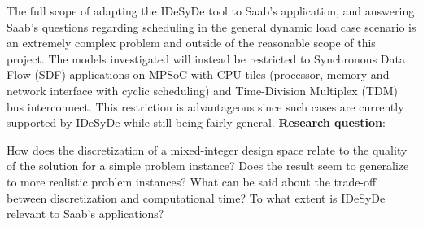 \documentclass[12pt,notitlepage]{article}
\begin{document}
The full scope of adapting the IDeSyDe tool to Saab's application, and answering Saab's questions regarding scheduling in the general dynamic load case scenario is an extremely complex problem and outside of the reasonable scope of this project. The models investigated will instead be restricted to Synchronous Data Flow (SDF) applications on MPSoC with CPU tiles (processor, memory and network interface with cyclic scheduling) and Time-Division Multiplex (TDM) bus interconnect. This restriction is advantageous since such cases are currently supported by IDeSyDe while still being fairly general.
\newline\newline
\noindent\textbf{Research question}:

How does the discretization of a mixed-integer design space relate to the quality of the solution for a simple problem instance? Does the result seem to generalize to more realistic problem instances? What can be said about the trade-off between discretization and computational time? To what extent is IDeSyDe relevant to Saab's applications?
\end{document}
